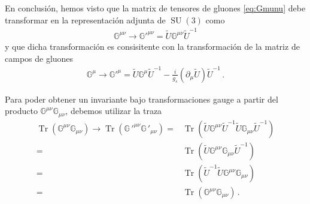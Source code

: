 En conclusión, hemos visto que la matrix de tensores de gluones \eqref{eq:Gmunu} debe transformar en la representación adjunta de $\operatorname{SU}(3)$ como
\begin{align}
\label{eq:pGmunu}
  \mathbb{G}^{\mu\nu}\to  {\mathbb{G}'}^{\mu\nu}=\widetilde{U}  \mathbb{G}^{\mu\nu} \widetilde{U}^{-1}
\end{align}
y que dicha transformación es consisitente con la transformación de la matriz de campos de gluones
\begin{align}
  \mathbb{G}^{\mu}\to {\mathbb{G}'}^{\mu}= \widetilde{U} \mathbb{G}^{\mu} \widetilde{U}^{-1}
-\frac{i}{g_s} \left( \partial_{\mu} \widetilde{U} \right) \widetilde{U}^{-1}\,.
\end{align}

\begin{frame}
Para poder obtener un invariante bajo transformaciones gauge a partir del producto $\mathbb{G}^{\mu\nu}\mathbb{G}_{\mu\nu}$, debemos utilizar la traza 
\begin{align}
  \operatorname{Tr}\left(\mathbb{G}^{\mu\nu}\mathbb{G}_{\mu\nu}\right)\to
  \operatorname{Tr}\left({\mathbb{G}\,'}^{\mu\nu}{\mathbb{G}\,'}_{\mu\nu}\right)
  =&\operatorname{Tr}\left(\widetilde{U}{{\mathbb{G}}}^{\mu\nu}\widetilde{U}^{-1}\widetilde{U}{{\mathbb{G}}}_{\mu\nu}\widetilde{U}^{-1}\right)\nonumber\\
  =&\operatorname{Tr}\left(\widetilde{U}{{\mathbb{G}}}^{\mu\nu}{{\mathbb{G}}}_{\mu\nu}\widetilde{U}^{-1}\right)\nonumber\\
  =&\operatorname{Tr}\left(\widetilde{U}^{-1}\widetilde{U}{{\mathbb{G}}}^{\mu\nu}{{\mathbb{G}}}_{\mu\nu}\right)\nonumber\\
  =&\operatorname{Tr}\left({{\mathbb{G}}}^{\mu\nu}{{\mathbb{G}}}_{\mu\nu}\right)\,.
\end{align}
\end{frame}

